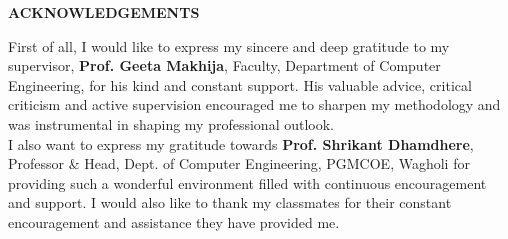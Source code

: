 \thispagestyle{plain}

\begin{center}
 \Large {\bf \uppercase{Acknowledgements}}
\end{center}

\vspace{3\baselineskip}

\justify
\noindent
First of all, I would like to express my sincere  and deep gratitude to my supervisor, \textbf{Prof. Geeta Makhija}, Faculty, Department of Computer Engineering, for his kind and constant support. His valuable advice, critical criticism and active supervision encouraged me to sharpen my methodology and was instrumental in shaping my professional outlook.\\

I also want to express my gratitude towards \textbf{Prof. Shrikant Dhamdhere}, Professor \& Head, Dept. of Computer Engineering, PGMCOE, Wagholi for providing such a wonderful environment filled with continuous encouragement and support. I would also like to thank my classmates for their constant encouragement and assistance they have provided me. \\[4cm]
 
